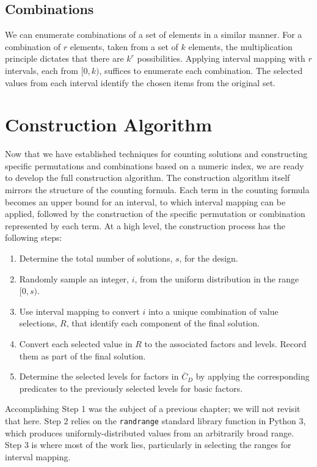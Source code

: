 \subsection{Combinations}

We can enumerate combinations of a set of elements in a similar manner. For a combination of $r$ elements, taken from a set of $k$ elements, the multiplication principle dictates that there are $k^r$ possibilities. Applying interval mapping with $r$ intervals, each from $[0, k)$, suffices to enumerate each combination. The selected values from each interval identify the chosen items from the original set.

\section{Construction Algorithm}

Now that we have established techniques for counting solutions and constructing specific permutations and combinations based on a numeric index, we are ready to develop the full construction algorithm. The construction algorithm itself mirrors the structure of the counting formula. Each term in the counting formula becomes an upper bound for an interval, to which interval mapping can be applied, followed by the construction of the specific permutation or combination represented by each term. At a high level, the construction process has the following steps:

\begin{enumerate}
\item Determine the total number of solutions, $s$, for the design.
\item Randomly sample an integer, $i$, from the uniform distribution in the range $[0, s)$.
\item Use interval mapping to convert $i$ into a unique combination of value selections, $R$, that identify each component of the final solution.
\item Convert each selected value in $R$ to the associated factors and levels. Record them as part of the final solution.
\item Determine the selected levels for factors in $\overline{C}_D$ by applying the corresponding predicates to the previously selected levels for basic factors.
\end{enumerate}

Accomplishing Step 1 was the subject of a previous chapter; we will not revisit that here. Step 2 relies on the \texttt{randrange} standard library function in Python 3, which produces uniformly-distributed values from an arbitrarily broad range. Step 3 is where most of the work lies, particularly in selecting the ranges for interval mapping.


